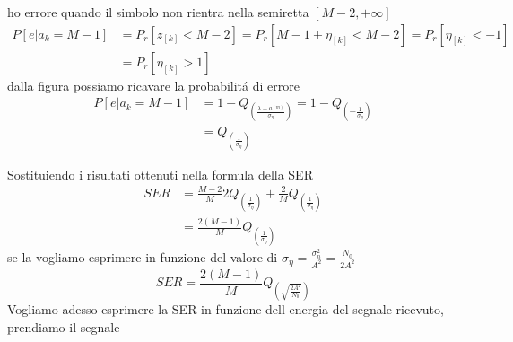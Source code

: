 \begin{enumerate}
{\begin{figure}[H]
                    \end{figure}
                    ho errore quando il simbolo non rientra nella semiretta $[M-2,+\infty]$
                    \begin{align}
                        P[e|a_k=M-1] &= P_r[z_{[k]}<M-2] = P_r[M-1+\eta_{[k]}<M-2] = P_r[\eta_{[k]}<-1] \nonumber \\
                                     &= P_r[\eta_{[k]}>1]\nonumber
                    \end{align}
                    dalla figura possiamo ricavare la probabilitá di errore 
                    \begin{align}
                        P[e|a_k=M-1] &= 1-Q_{\displaystyle \left(\frac{\lambda-a^{(m)}}{\sigma_\eta}\right)} = 1-Q_{\displaystyle\left(-\frac{1}{\sigma_\eta}\right)} \nonumber \\
                                     &= Q_{\displaystyle\left(\frac{1}{\sigma_\eta}\right)} \nonumber
                    \end{align}
                }
            \end{enumerate}
            Sostituiendo i risultati ottenuti nella formula della SER
            \begin{align}
                SER &= \frac{M-2}{M}2Q_{\displaystyle\left(\frac{1}{\sigma_\eta}\right)}+ \frac{2}{M}Q_{\displaystyle\left(\frac{1}{\sigma_\eta}\right)} \nonumber \\
                    &= \frac{2(M-1)}{M} Q_{\displaystyle\left(\frac{1}{\sigma_\eta}\right)} \nonumber
            \end{align}
            se la vogliamo esprimere in funzione del valore di $\sigma_\eta= \frac{\sigma_n^2}{A^2} = \frac{N_0}{2A^2}$
            \[
                SER = \frac{2(M-1)}{M} Q_{\displaystyle\left(\sqrt{\frac{2A^2}{N_0}}\right)} 
            \]
            Vogliamo adesso esprimere la SER in funzione dell energia del segnale ricevuto, prendiamo il segnale 
